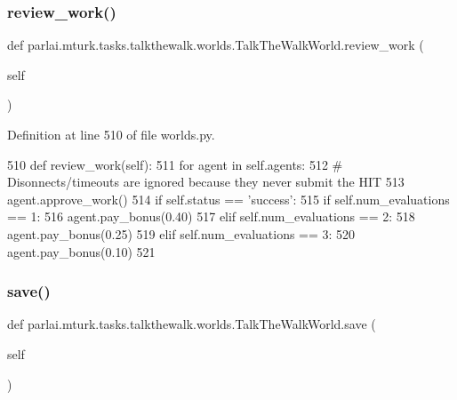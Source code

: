 \subsubsection{\texorpdfstring{review\+\_\+work()}{review\_work()}}
{\footnotesize\ttfamily def parlai.\+mturk.\+tasks.\+talkthewalk.\+worlds.\+Talk\+The\+Walk\+World.\+review\+\_\+work (\begin{DoxyParamCaption}\item[{}]{self }\end{DoxyParamCaption})}



Definition at line 510 of file worlds.\+py.


\begin{DoxyCode}
510     \textcolor{keyword}{def }review\_work(self):
511         \textcolor{keywordflow}{for} agent \textcolor{keywordflow}{in} self.agents:
512             \textcolor{comment}{# Disonnects/timeouts are ignored because they never submit the HIT}
513             agent.approve\_work()
514             \textcolor{keywordflow}{if} self.status == \textcolor{stringliteral}{'success'}:
515                 \textcolor{keywordflow}{if} self.num\_evaluations == 1:
516                     agent.pay\_bonus(0.40)
517                 \textcolor{keywordflow}{elif} self.num\_evaluations == 2:
518                     agent.pay\_bonus(0.25)
519                 \textcolor{keywordflow}{elif} self.num\_evaluations == 3:
520                     agent.pay\_bonus(0.10)
521 
\end{DoxyCode}
\mbox{\label{classparlai_1_1mturk_1_1tasks_1_1talkthewalk_1_1worlds_1_1TalkTheWalkWorld_a7ae3bea4994385c3b1222dbab5e7f88f}} 
\subsubsection{\texorpdfstring{save()}{save()}}
{\footnotesize\ttfamily def parlai.\+mturk.\+tasks.\+talkthewalk.\+worlds.\+Talk\+The\+Walk\+World.\+save (\begin{DoxyParamCaption}\item[{}]{self }\end{DoxyParamCaption})}

